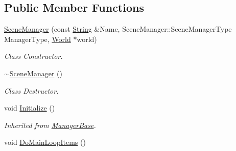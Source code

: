 \subsection*{Public Member Functions}
\begin{DoxyCompactItemize}
\item 
\hyperlink{classphys_1_1SceneManager_a3fc6eca0c09240141e6d7c0b0165e8fb}{SceneManager} (const \hyperlink{namespacephys_aa03900411993de7fbfec4789bc1d392e}{String} \&Name, SceneManager::SceneManagerType ManagerType, \hyperlink{classphys_1_1World}{World} $\ast$world)
\begin{DoxyCompactList}\small\item\em Class Constructor. \item\end{DoxyCompactList}\item 
\hyperlink{classphys_1_1SceneManager_a5076643eec92dc0c9c9ccb7ac2225cde}{$\sim$SceneManager} ()
\begin{DoxyCompactList}\small\item\em Class Destructor. \item\end{DoxyCompactList}\item 
\hypertarget{classphys_1_1SceneManager_aa13b380a4e38f706a1977237fc4b165e}{
void \hyperlink{classphys_1_1SceneManager_aa13b380a4e38f706a1977237fc4b165e}{Initialize} ()}
\label{dd/da8/classphys_1_1SceneManager_aa13b380a4e38f706a1977237fc4b165e}

\begin{DoxyCompactList}\small\item\em Inherited from \hyperlink{classphys_1_1ManagerBase}{ManagerBase}. \item\end{DoxyCompactList}\item 
\hypertarget{classphys_1_1SceneManager_a27a3f6b21e15f628642b1cad524f1a18}{
void \hyperlink{classphys_1_1SceneManager_a27a3f6b21e15f628642b1cad524f1a18}{DoMainLoopItems} ()}
\label{dd/da8/classphys_1_1SceneManager_a27a3f6b21e15f628642b1cad524f1a18}


\end{DoxyCompactItemize}

